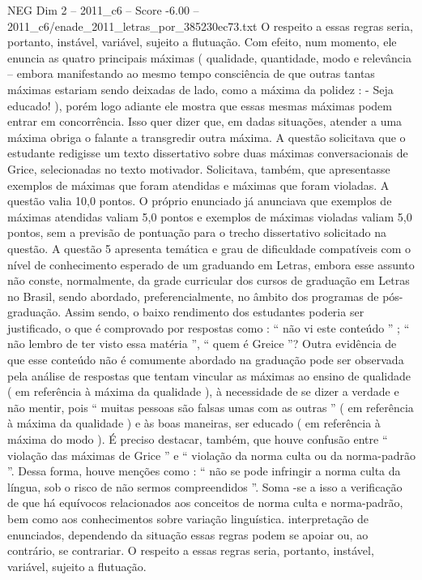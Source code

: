 \begin{textsample}{NEG Dim 2 – 2011\_c6 – Score -6.00 – 2011\_c6/enade\_2011\_letras\_por\_385230ec73.txt}
O respeito a essas regras seria, portanto, instável, variável, sujeito a flutuação.
Com efeito, num momento, ele enuncia as quatro principais máximas ( qualidade, quantidade, modo e relevância – embora manifestando ao mesmo tempo consciência de que outras tantas máximas estariam sendo deixadas de lado, como a máxima da polidez : - Seja educado! ), porém logo adiante ele mostra que essas mesmas máximas podem entrar em concorrência.
Isso quer dizer que, em dadas situações, atender a uma máxima obriga o falante a transgredir outra máxima.
A questão solicitava que o estudante redigisse um texto dissertativo sobre duas máximas conversacionais de Grice, selecionadas no texto motivador.
Solicitava, também, que apresentasse exemplos de máximas que foram atendidas e máximas que foram violadas.
A questão valia 10,0 pontos.
O próprio enunciado já anunciava que exemplos de máximas atendidas valiam 5,0 pontos e exemplos de máximas violadas valiam 5,0 pontos, sem a previsão de pontuação para o trecho dissertativo solicitado na questão.
A questão 5 apresenta temática e grau de dificuldade compatíveis com o nível de conhecimento esperado de um graduando em Letras, embora esse assunto não conste, normalmente, da grade curricular dos cursos de graduação em Letras no Brasil, sendo abordado, preferencialmente, no âmbito dos programas de pós-graduação.
Assim sendo, o baixo rendimento dos estudantes poderia ser justificado, o que é comprovado por respostas como : “ não vi este conteúdo ” ; “ não lembro de ter visto essa matéria ”, “ quem é Greice ”?
Outra evidência de que esse conteúdo não é comumente abordado na graduação pode ser observada pela análise de respostas que tentam vincular as máximas ao ensino de qualidade ( em referência à máxima da qualidade ), à necessidade de se dizer a verdade e não mentir, pois “ muitas pessoas são falsas umas com as outras ” ( em referência à máxima da qualidade ) e às boas maneiras, ser educado ( em referência à máxima do modo ).
É preciso destacar, também, que houve confusão entre “ violação das máximas de Grice ” e “ violação da norma culta ou da norma-padrão ”.
Dessa forma, houve menções como : “ não se pode infringir a norma culta da língua, sob o risco de não sermos compreendidos ”.
Soma -se a isso a verificação de que há equívocos relacionados aos conceitos de norma culta e norma-padrão, bem como aos conhecimentos sobre variação linguística. interpretação de enunciados, dependendo da situação essas regras podem se apoiar ou, ao contrário, se contrariar.
O respeito a essas regras seria, portanto, instável, variável, sujeito a flutuação.

\end{textsample}

